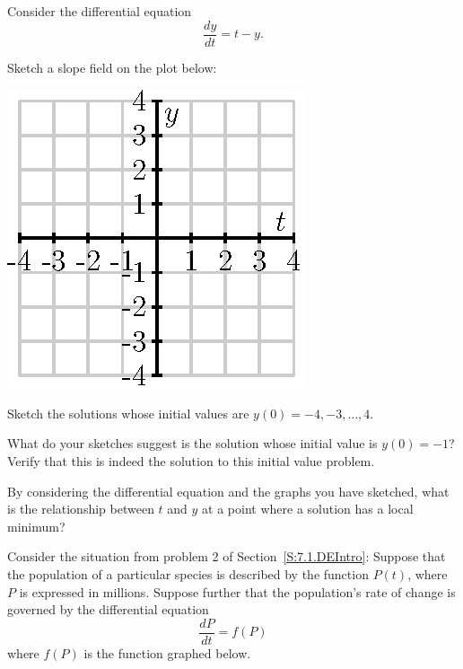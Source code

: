 \begin{exercises} 
  \item  Consider the differential equation
    $$
    \frac{dy}{dt} = t-y.
    $$
    
    \ba
    	\item Sketch a slope field on the plot below:
    \begin{center}
      \includegraphics{figures/7_2_ex_1.eps}
    \end{center}

    \item  Sketch the solutions whose initial values are $y(0)= -4, -3, \ldots, 4$.  

    \item  What do your sketches suggest is the solution whose initial
    value is $y(0) = -1$?  Verify that this is indeed the solution to
    this initial value problem.

    \item  By considering the differential equation and the graphs you
    have sketched, what is the relationship between $t$ and $y$ at a
    point where a solution has a local minimum?
    \ea
  
  \item Consider the situation from problem 2 of Section~\ref{S:7.1.DEIntro}:  Suppose
    that the population of a particular species is  
    described by the function $P(t)$, where $P$ is expressed in
    millions.  Suppose further that the population's rate of change is
    governed by the differential equation 
    $$\frac{dP}{dt} = f(P)
    $$
    where $f(P)$ is the function graphed below.


\end{exercises}

